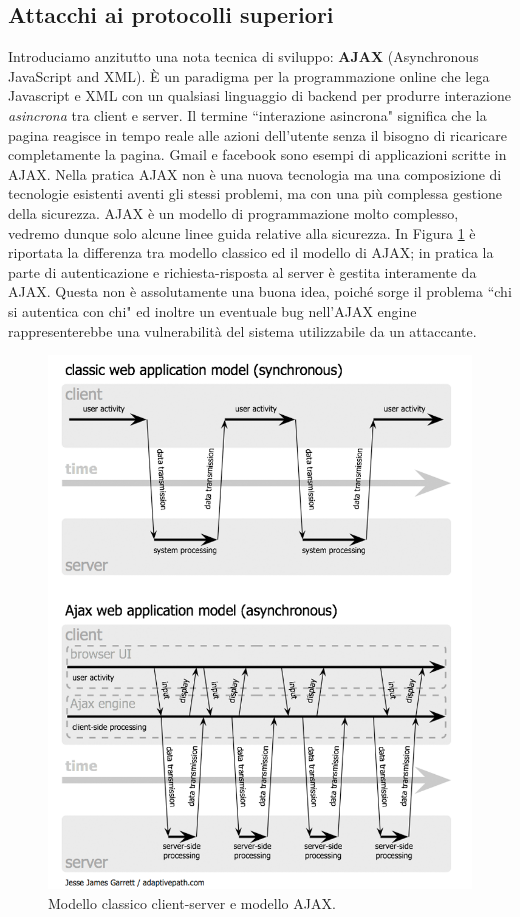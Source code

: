 \subsection{Attacchi ai protocolli superiori}
Introduciamo anzitutto una nota tecnica di sviluppo: \textbf{AJAX} (Asynchronous JavaScript and XML). È un paradigma per la programmazione online che lega Javascript e XML con un qualsiasi linguaggio di backend per produrre interazione \textit{asincrona} tra client e server. Il termine \textquotedblleft interazione asincrona" significa che la pagina reagisce in tempo reale alle azioni dell'utente senza il bisogno di ricaricare completamente la pagina. Gmail e facebook sono esempi di applicazioni scritte in AJAX. Nella pratica AJAX non è una nuova tecnologia ma una composizione di
tecnologie esistenti aventi gli stessi problemi, ma con una più complessa gestione della sicurezza. AJAX è un modello di programmazione molto complesso, vedremo dunque solo alcune linee guida relative alla sicurezza. In Figura \ref{img:ajax-model} è riportata la differenza tra modello classico ed il modello di AJAX; in pratica la parte di autenticazione e richiesta-risposta al server è gestita interamente da AJAX. Questa non è assolutamente una buona idea, poiché sorge il problema \textquotedblleft chi si autentica con chi" ed inoltre un eventuale bug nell'AJAX engine rappresenterebbe una vulnerabilità del sistema utilizzabile da un attaccante.
\begin{figure}[htbp]
	\centering
	\includegraphics[scale = 0.35]{images/ajax-model}
	\caption{Modello classico client-server e modello AJAX.}
	\label{img:ajax-model}
\end{figure}\\
